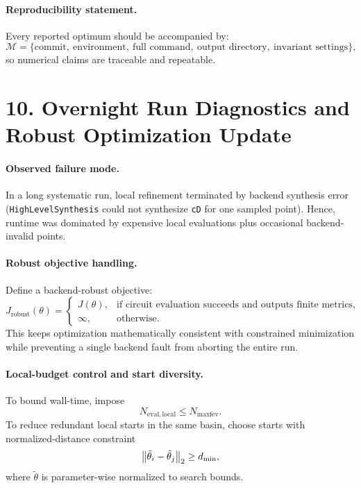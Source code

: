 \documentclass[11pt]{article}
\begin{document}
\paragraph{Reproducibility statement.}
Every reported optimum should be accompanied by:
\begin{equation}
\mathcal{M}=\{\text{commit},\ \text{environment},\ \text{full command},\ \text{output directory},\ \text{invariant settings}\},
\end{equation}
so numerical claims are traceable and repeatable.

\section*{10. Overnight Run Diagnostics and Robust Optimization Update}
\paragraph{Observed failure mode.}
In a long systematic run, local refinement terminated by backend synthesis error
(\texttt{HighLevelSynthesis} could not synthesize \texttt{cD} for one sampled point).
Hence, runtime was dominated by expensive local evaluations plus occasional backend-invalid points.

\paragraph{Robust objective handling.}
Define a backend-robust objective:
\begin{equation}
J_{\mathrm{robust}}(\theta)=
\begin{cases}
J(\theta), & \text{if circuit evaluation succeeds and outputs finite metrics},\\
\infty, & \text{otherwise}.
\end{cases}
\end{equation}
This keeps optimization mathematically consistent with constrained minimization while preventing a single backend fault from aborting the entire run.

\paragraph{Local-budget control and start diversity.}
To bound wall-time, impose
\begin{equation}
N_{\mathrm{eval,local}} \le N_{\mathrm{maxfev}}.
\end{equation}
To reduce redundant local starts in the same basin, choose starts with normalized-distance constraint
\begin{equation}
\norm{\tilde\theta_i-\tilde\theta_j}_2 \ge d_{\min},
\end{equation}
where $\tilde\theta$ is parameter-wise normalized to search bounds.
\end{document}
